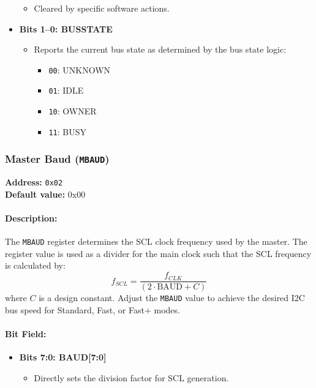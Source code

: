 \begin{itemize}[leftmargin=*,itemsep=2mm]
\begin{itemize}
          \item Cleared by specific software actions.
        \end{itemize}
  \item \textbf{Bits 1--0: BUSSTATE}  
        \begin{itemize}
          \item Reports the current bus state as determined by the bus state logic:
                \begin{itemize}
                  \item \texttt{00}: UNKNOWN
                  \item \texttt{01}: IDLE
                  \item \texttt{10}: OWNER
                  \item \texttt{11}: BUSY
                \end{itemize}
        \end{itemize}
\end{itemize}

\vspace{2mm}

\subsubsection{Master Baud (\texttt{MBAUD})}
\label{sec:mbaud}

\textbf{Address:} \texttt{0x02} \\
\textbf{Default value:} 0x00

\paragraph{Description:}  
The \texttt{MBAUD} register determines the SCL clock frequency used by the master. The register value is used as a
divider for the main clock such that the SCL frequency is calculated by:
\[
f_{SCL} = \frac{f_{CLK}}{(2 \cdot \text{BAUD} + C)}
\]
where \(C\) is a design constant. Adjust the \texttt{MBAUD} value to achieve the desired I2C bus speed for Standard,
Fast, or Fast+ modes.

\paragraph{Bit Field:}
\begin{itemize}[leftmargin=*,itemsep=2mm]
  \item \textbf{Bits 7:0: BAUD[7:0]}  
        \begin{itemize}
          \item Directly sets the division factor for SCL generation.
        \end{itemize}
\end{itemize}

